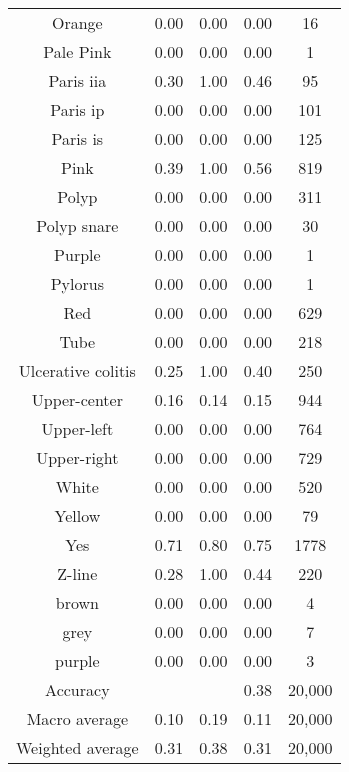 \begin{center}
\begin{longtable}{|c|c|c|c|c|}
Orange  &   0.00  &  0.00  &  0.00  &    16 \\
Pale Pink  &   0.00  &  0.00  &  0.00   &  1 \\
Paris iia  &   0.30  &  1.00  &  0.46  &    95 \\
Paris ip  &   0.00  &  0.00  &  0.00  &   101 \\
Paris is  &   0.00  &  0.00  &  0.00  &   125 \\
Pink  &   0.39  &  1.00  &  0.56  &   819 \\
Polyp  &   0.00  &  0.00  &  0.00  &   311 \\
Polyp snare  &   0.00  &  0.00  &  0.00  &    30 \\
Purple  &   0.00  &  0.00  &  0.00   &  1 \\
Pylorus  &   0.00  &  0.00  &  0.00   &  1 \\
Red  &   0.00  &  0.00  &  0.00  &   629 \\
Tube  &   0.00  &  0.00  &  0.00  &   218 \\
Ulcerative colitis  &   0.25  &  1.00  &  0.40  &   250 \\
Upper-center  &   0.16  &  0.14  &  0.15  &   944 \\
Upper-left  &   0.00  &  0.00  &  0.00  &   764 \\
Upper-right  &   0.00  &  0.00  &  0.00  &   729 \\
White  &   0.00  &  0.00  &  0.00  &   520 \\
Yellow  &   0.00  &  0.00  &  0.00  &    79 \\
Yes  &   0.71  &  0.80  &  0.75  &  1778 \\
Z-line  &   0.28  &  1.00  &  0.44  &   220 \\
brown  &   0.00  &  0.00  &  0.00   &  4 \\
grey  &   0.00  &  0.00  &  0.00   &  7 \\
purple  &   0.00  &  0.00  &  0.00   &  3 \\
\hline
Accuracy &  &  & 0.38 &  20,000 \\
Macro average &  0.10 &   0.19 &  0.11 &   20,000 \\
Weighted average  &  0.31 &   0.38 &  0.31 &   20,000 \\


\end{longtable}
\end{center}